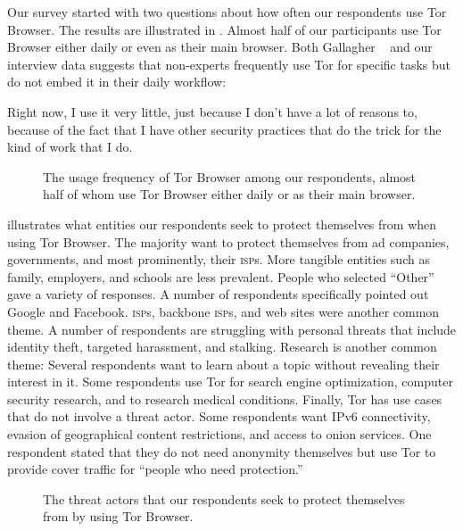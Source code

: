 Our survey started with two questions about how often our respondents use Tor
Browser.  The results are illustrated in .  Almost half of
our participants use Tor Browser either daily or even as their main browser.
Both Gallagher \ea~\cite[\S~4.3.2]{Gallagher2017a} and our interview data
suggests that non-experts frequently use Tor for specific tasks but do not embed
it in their daily workflow:

\begin{displayquote}[P07]
Right now, I use it very little, just because I don't have a lot of reasons to,
because of the fact that I have other security practices that do the trick for
the kind of work that I do.
\end{displayquote}

\begin{figure}[t]
    \centering
    
    \caption{The usage frequency of Tor Browser among our respondents, almost
    half of whom use Tor Browser either daily or as their main browser.}
    \label{fig:tor-usage}
\end{figure}

 illustrates what entities our respondents seek to protect
themselves from when using Tor Browser.  The majority want to protect themselves
from ad companies, governments, and most prominently, their \textsc{isp}s.
More tangible entities such as family, employers, and schools are less prevalent.
People who selected ``Other'' gave a variety of responses.  A number of respondents
specifically pointed out Google and Facebook.  \textsc{isp}s, backbone
\textsc{isp}s, and web sites were another common theme.  A number of respondents
are struggling with personal threats that include identity theft, targeted
harassment, and stalking.  Research is another common theme: Several respondents
want to learn about a topic without revealing their interest in it.  Some
respondents use Tor for search engine optimization, computer security research,
and to research medical conditions.  Finally, Tor has use cases that do not
involve a threat actor.  Some respondents want IPv6 connectivity, evasion of
geographical content restrictions, and access to onion services.  One respondent
stated that they do not need anonymity themselves but use Tor to provide cover
traffic for ``people who need protection.''


\begin{figure}[t]
    \centering
    
    \caption{The threat actors that our respondents seek to protect themselves
    from by using Tor Browser.}
    \label{fig:tor-threats}
\end{figure}

